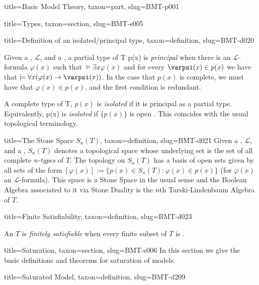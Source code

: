 \documentclass[a4paper]{article}
\begin{document}
\begin{tree}{title={Basic Model Theory}, taxon={part}, slug={BMT-p001}}
\begin{tree}{title={Types}, taxon={section}, slug={BMT-s005}}
\begin{tree}{title={Definition of an isolated/principal type}, taxon={definition}, slug={BMT-d020}}

    Given a , \(\mathcal {L}\), and a ,
    a partial type of T {p(x)} is \emph{principal} when there is an \(\mathcal {L}\)-formula \(\varphi (x)\) such that
    \(\models   \exists  x  \varphi (x)\) and for every \(\varpsi (x)  \in  p(x)\) we have that
    \(\models   \forall  x ( \varphi (x)  \rightarrow   \varpsi (x))\).
    In the case that \(p(x)\) is complete, we must have that \(\varphi (x) \in  p(x)\),
    and the first condition is redundant.
\par{
    A complete type of T, \(p(x)\) is \emph{isolated} if it is principal as a partial type.
    Equivalently, {p(x)} is \emph{isolated} if \(\{ p(x) \}\) is open .
    This coincides with the usual topological terminology.
}
\end{tree}

\begin{tree}{title={The Stone Space \(S_n(T)\)}, taxon={definition}, slug={BMT-d021}}
Given a , \(\mathcal {L}\), and a ,
\(S_n(T)\) denotes a topological space whose underlying set is the set of all complete \emph{n-types} of \(T\).
The topology on \(S_n(T)\) has a basis of open sets given by all sets of the form \([ \varphi (x)] :=  \{ p(x) \in  S_n(T):
 \varphi (x)  \in  p(x) \}\) (for \(\varphi (x)\) an \(\mathcal {L}\)-formula).
This space is a Stone Space in the usual sense and the Boolean Algebra associated to it via Stone Duality is
the \(n\)th Tarski-Lindenbaum Algebra of \(T\).
\end{tree}

\begin{tree}{title={Finite Satisfiability}, taxon={definition}, slug={BMT-d023}}

    An  \(T\) is \emph{finitely satisfiable} when every finite subset of \(T\) is .

\end{tree}

\end{tree}


  
  
\begin{tree}{title={Saturation}, taxon={section}, slug={BMT-s006}}
In this section we give the basic definitions and theorems for saturation of models.
\begin{tree}{title={Saturated Model}, taxon={definition}, slug={BMT-d209}}


\end{tree}
\end{tree}
\end{tree}
\end{document}
